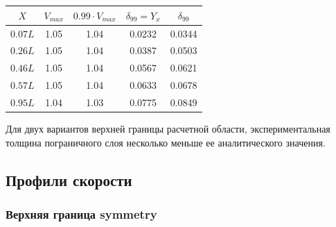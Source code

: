 \documentclass{article}
\newcommand{\n}{\vspace{\baselineskip}}
\newcommand{\ntb}{\tabularnewline}
\begin{document}
\begin{minipage}{\linewidth}
  \begin{minipage}{0.5\linewidth}
  \end{minipage}
  \hfill
  \begin{minipage}[b]{0.5\linewidth}
  \\ \quad \\
    \begin{tabular}[h!]{c|c|c|cc}
    $X$ & $V_{max}$ & $0.99 \cdot V_{max}$ & $\delta_{99} = Y_{x}$ & $\delta_{99}$ \ntb
    \hline  
    $0.07L$ & 1.05 & 1.04 & 0.0232 & 0.0344  \ntb
    \hline  
    $0.26L$ & 1.05 & 1.04 & 0.0387 & 0.0503  \ntb
    \hline  
    $0.46L$ & 1.05 & 1.04 & 0.0567 & 0.0621  \ntb
    \hline  
    $0.57L$ & 1.05 & 1.04 & 0.0633 & 0.0678  \ntb
    \hline  
    $0.95L$ & 1.04 & 1.03 & 0.0775 & 0.0849  \ntb
    \end{tabular}
  \end{minipage}
\end{minipage}

\n\n
Для двух вариантов верхней границы расчетной области, экспериментальная толщина пограничного слоя несколько меньше ее аналитического значения.

\subsection{Профили скорости}
\subsubsection{Верхняя граница symmetry}
\end{document}
